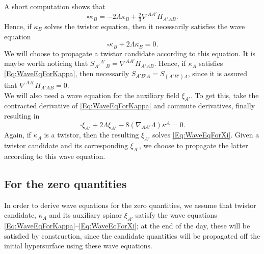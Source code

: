 \documentclass[10pt,a4paper]{article}
\theoremstyle{plain}
\begin{document}
A short computation shows that 
\[\square \kappa_B = -2\Lambda \kappa_B + \tfrac{2}{3}\nabla^{AA'}H_{A'AB}. \]
Hence, if $\kappa_B$ solves the twistor equation, then it necessarily satisfies the wave equation 
\begin{equation}
    \square \kappa_B + 2\Lambda \kappa_B = 0. \label{Eq:WaveEqForKappa}
\end{equation}
We will choose to propagate a twistor candidate according to this equation. It is maybe worth noticing that $S_{A'}{}^{A'}{}_B=\nabla^{AA'}H_{A'AB}$. Hence, if $\kappa_A$ satisfies \eqref{Eq:WaveEqForKappa}, then necessarily $S_{A'B'A} = S_{(A'B')A}$, since it is assured that $\nabla^{AA'}H_{A'AB}=0$. 
\\

We will also need a wave equation for the auxiliary field $\xi_{A'}$. To get this, take the contracted derivative of \eqref{Eq:WaveEqForKappa} and commute derivatives, finally resulting in 
\begin{equation}
    \square \xi_{A'} + 2\Lambda \xi_{A'} - 8(\nabla_{AA'}\Lambda)\kappa^A = 0. \label{Eq:WaveEqForXi}
\end{equation}
Again, if $\kappa_A$ is a twistor, then the resulting $\xi_{A'}$ solves \eqref{Eq:WaveEqForXi}. Given a twistor candidate and its corresponding $\xi_{A'}$, we choose to propagate the latter according to this wave equation. 

\subsection{For the zero quantities}

In order to derive wave equations for the zero quantities, we assume that twistor candidate, $\kappa_A$ and its auxiliary spinor $\xi_{A'}$ satisfy the wave equations \eqref{Eq:WaveEqForKappa}--\eqref{Eq:WaveEqForXi}; at the end of the day, these will be satisfied by construction, since the candidate quantities will be propagated off the initial hypersurface using these wave equations.  
\\
\end{document}
